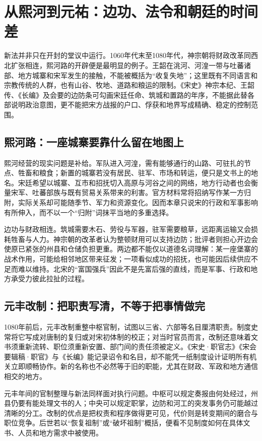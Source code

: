 \section{从熙河到元祐：边功、法令和朝廷的时间差}

新法并非只在开封的堂议中运行。1060年代末至1080年代，神宗朝将财政改革同西北扩张相连，熙河路的开辟便是最明显的例子。王韶在洮河、河湟一带与吐蕃诸部、地方城寨和宋军发生的接触，不能被概括为“收复失地”；这里既有不同语言和宗教传统的人群，也有山谷、牧地、道路和粮运的限制。《宋史》神宗本纪、王韶传、《长编》及会要的边防条可勾画宋廷任命、筑城和置路的年序，不能据此替各部说明政治意图，更不能把宋方战报的户口、俘获和地界写成精确、稳定的控制范围。

\subsection{熙河路：一座城寨要靠什么留在地图上}

熙河经营的现实问题是补给。军队进入河湟，需有能够通行的山路、可驻扎的节点、牲畜和粮食；新置的城寨若没有居民、驻军、市场和转运，便只是文书上的地名。宋廷希望以城寨、互市和招抚切入高原与河谷之间的网络，地方行动者也会衡量宋军、吐蕃部族与既有贸易关系带来的利害。官方材料常将招纳写作某一方归附，实际关系却可能随季节、军力和资源变化。因而本章只说宋的行政和军事影响有所伸入，而不以一个“归附”词抹平当地的多重选择。

边功与财政相连。筑城需要木石、劳役与军器，驻军需要粮草，远距离运输又会损耗牲畜与人力。神宗朝的改革者认为整顿财用可以支持边防；批评者则担心开边会使原已紧张的州县和仓储负担更重。两边都不能仅以道德名词理解：某一座堡寨的战术作用，可能给相邻地区带来征发；一项看似成功的招抚，也可能因后续供应不足而难以维持。北宋的“富国强兵”因此不是先富后强的直线，而是军事、行政和地方承受力彼此拉扯的过程。

\subsection{元丰改制：把职责写清，不等于把事情做完}

1080年前后，元丰改制重整中枢官制，试图以三省、六部等名目厘清职责。制度史常将它写成对唐制的复归或对宋初体制的校正；对当时官员而言，改制还意味着文书须重新流转、职位须重新安置、部门间的责任须被定义。《宋史·职官志》《宋会要辑稿·职官》与《长编》能记录诏令和名目，却不能凭一纸制度设计证明所有机关立即顺畅协作。新的名称也不必然等于旧的职能，尤其在财政、军政和地方通信相交的地方。

元丰年间的官制整理与新法同样面对执行问题。中枢可以规定奏报由何处经过，州县仍要有能处理文书的人；中央可以规定职掌，边防和河工的突发事务仍可能越过清晰的分工。改制的优点是把权责和程序做得更可见，代价则是转变期间的磨合与职位竞争。后世若以“恢复祖制”或“破坏祖制”概括，便看不见制度如何在具体文书、人员和地方需求中被使用。

